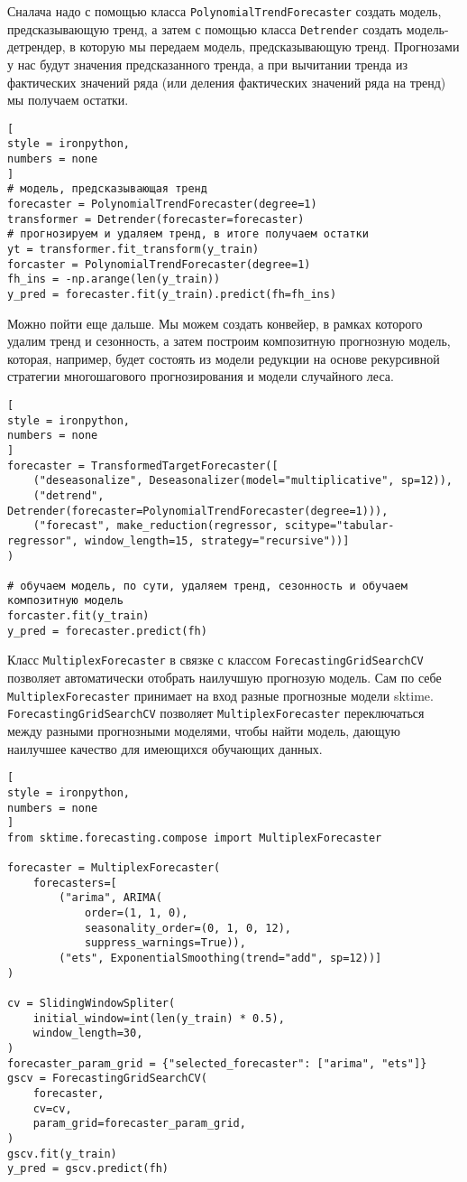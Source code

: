 \documentclass[%
	11pt,
	a4paper,
	utf8,
		]{article}
\begin{document}
Сналача надо с помощью класса \verb|PolynomialTrendForecaster| создать модель, предсказывающую тренд, а затем с помощью класса \verb|Detrender| создать модель-детрендер, в которую мы передаем модель, предсказывающую тренд. Прогнозами у нас будут значения предсказанного тренда, а при вычитании тренда из фактических значений ряда (или деления фактических значений ряда на тренд) мы получаем остатки.
\begin{lstlisting}[
style = ironpython,
numbers = none
]
# модель, предсказывающая тренд
forecaster = PolynomialTrendForecaster(degree=1)
transformer = Detrender(forecaster=forecaster)
# прогнозируем и удаляем тренд, в итоге получаем остатки
yt = transformer.fit_transform(y_train)
forcaster = PolynomialTrendForecaster(degree=1)
fh_ins = -np.arange(len(y_train))
y_pred = forecaster.fit(y_train).predict(fh=fh_ins)
\end{lstlisting} 

Можно пойти еще дальше. Мы можем создать конвейер, в рамках которого удалим тренд и сезонность, а затем построим композитную прогнозную модель, которая, например, будет состоять из модели редукции на основе рекурсивной стратегии многошагового прогнозирования и модели случайного леса.
\begin{lstlisting}[
style = ironpython,
numbers = none
]
forecaster = TransformedTargetForecaster([
    ("deseasonalize", Deseasonalizer(model="multiplicative", sp=12)),
    ("detrend", Detrender(forecaster=PolynomialTrendForecaster(degree=1))),
    ("forecast", make_reduction(regressor, scitype="tabular-regressor", window_length=15, strategy="recursive"))]
)

# обучаем модель, по сути, удаляем тренд, сезонность и обучаем композитную модель
forcaster.fit(y_train)
y_pred = forecaster.predict(fh)
\end{lstlisting}

Класс \verb|MultiplexForecaster| в связке с классом \verb|ForecastingGridSearchCV| позволяет автоматически отобрать наилучшую прогнозую модель. Сам по себе \verb|MultiplexForecaster| принимает на вход разные прогнозные модели sktime. \verb|ForecastingGridSearchCV| позволяет \verb|MultiplexForecaster| переключаться между разными прогнозными моделями, чтобы найти модель, дающую наилучшее качество для имеющихся обучающих данных.
\begin{lstlisting}[
style = ironpython,
numbers = none
]
from sktime.forecasting.compose import MultiplexForecaster

forecaster = MultiplexForecaster(
    forecasters=[
        ("arima", ARIMA(
            order=(1, 1, 0),
            seasonality_order=(0, 1, 0, 12),
            suppress_warnings=True)),
        ("ets", ExponentialSmoothing(trend="add", sp=12))]
)

cv = SlidingWindowSpliter(
    initial_window=int(len(y_train) * 0.5),
    window_length=30,
)
forecaster_param_grid = {"selected_forecaster": ["arima", "ets"]}
gscv = ForecastingGridSearchCV(
    forecaster,
    cv=cv,
    param_grid=forecaster_param_grid,
)
gscv.fit(y_train)
y_pred = gscv.predict(fh)
\end{lstlisting}
\end{document}
